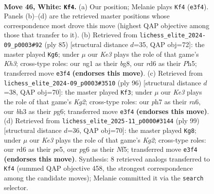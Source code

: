 \documentclass[11pt]{article}
\begin{document}
\clearpage

\begin{figure}[p]\centering
\begin{subfigure}{0.46\textwidth}\centering
\resizebox{\linewidth}{!}{%
\newchessgame
\chessboard[
  setfen={8/5p1p/3r2pk/R7/1p2P3/4K1Pb/4r3/6n1 w - - 2 46},
  showmover=false,
  pgfstyle=straightmove, color=movearrow, markmove={e3-f4}
]}
\caption{}
\end{subfigure}\hfill
\begin{subfigure}{0.46\textwidth}\centering
\resizebox{\linewidth}{!}{%
\newchessgame
\chessboard[
  setfen={6B1/7R/7k/6pp/Pb6/4P1P1/4KP2/2r5 b - - 1 43},
  showmover=false,
  pgfstyle=straightmove, color=movearrow, markmove={h6-g6}
]}
\caption{}
\end{subfigure}
\\[4pt]
\begin{subfigure}{0.46\textwidth}\centering
\resizebox{\linewidth}{!}{%
\newchessgame
\chessboard[
  setfen={8/kp3pp1/r5p1/8/6n1/6P1/1R4Kr/8 w - - 0 49},
  showmover=false,
  pgfstyle=straightmove, color=movearrow, markmove={g2-f3}
]}
\caption{}
\end{subfigure}\hfill
\begin{subfigure}{0.46\textwidth}\centering
\resizebox{\linewidth}{!}{%
\newchessgame
\chessboard[
  setfen={8/5Rk1/6p1/4PnN1/5P2/7P/r5P1/5BK1 b - - 0 50},
  showmover=false,
  pgfstyle=straightmove, color=movearrow, markmove={g7-g8}
]}
\caption{}
\end{subfigure}
\caption{\textbf{Move 46, White: \texttt{Kf4}.} (a) Our position; Melanie plays \texttt{Kf4} (\texttt{e3f4}). Panels (b)--(d) are the retrieved master positions whose correspondence most drove this move (highest QAP objective among those that transfer to it). (b) Retrieved from \texttt{lichess\_elite\_2024-09\_p0003\#92} (ply 85) [structural distance $d$=35, QAP obj=72]: the master played \texttt{Kg6}; under $\mu$ our \emph{Ke3} plays the role of that game's \emph{Kh3}; cross-type roles: our \emph{n}g1 as their \emph{b}g8, our \emph{r}d6 as their \emph{P}h5; transferred move \texttt{e3f4} \textbf{(endorses this move)}. (c) Retrieved from \texttt{lichess\_elite\_2024-09\_p0003\#3510} (ply 96) [structural distance $d$=38, QAP obj=70]: the master played \texttt{Kf3}; under $\mu$ our \emph{Ke3} plays the role of that game's \emph{Kg2}; cross-type roles: our \emph{p}h7 as their \emph{r}a6, our \emph{b}h3 as their \emph{p}g6; transferred move \texttt{e3f4} \textbf{(endorses this move)}. (d) Retrieved from \texttt{lichess\_elite\_2025-11\_p0000\#3144} (ply 99) [structural distance $d$=36, QAP obj=70]: the master played \texttt{Kg8}; under $\mu$ our \emph{Ke3} plays the role of that game's \emph{Kg2}; cross-type roles: our \emph{r}d6 as their \emph{p}e5, our \emph{p}g6 as their \emph{N}f5; transferred move \texttt{e3f4} \textbf{(endorses this move)}. Synthesis: 8 retrieved analogs transferred to \texttt{Kf4} (summed QAP objective 458, the strongest correspondence among the candidate moves); Melanie committed it via the \texttt{search} selector.}
\label{fig:thought-m90}
\end{figure}
\end{document}
